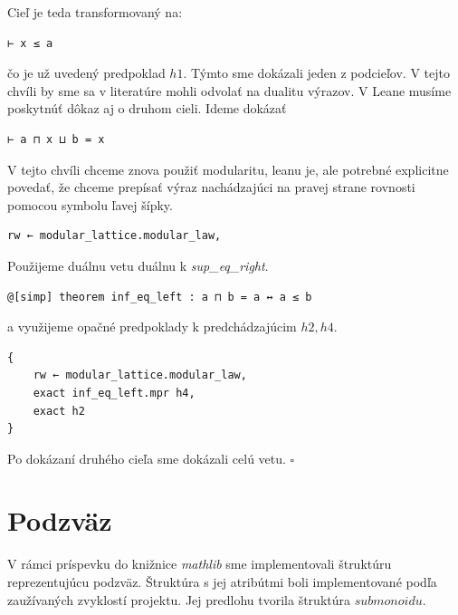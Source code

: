 \documentclass[a4paper,10pt,oneside]{report}%
\begin{document}
    Cieľ je teda transformovaný na:
\begin{lstlisting}
⊢ x ≤ a
\end{lstlisting}
čo je už uvedený predpoklad $h1$. Týmto sme dokázali jeden z podcieľov.
    V tejto chvíli by sme sa v literatúre mohli odvolať na dualitu výrazov.
    V Leane musíme poskytnúť dôkaz aj o druhom cieli. Ideme dokázať
\begin{lstlisting}
⊢ a ⊓ x ⊔ b = x
\end{lstlisting}
V tejto chvíli chceme znova použiť modularitu, leanu je, ale potrebné explicitne povedať,
    že chceme prepísať výraz nachádzajúci na pravej strane rovnosti pomocou symbolu
ľavej šípky.
\begin{lstlisting}
rw ← modular_lattice.modular_law,
\end{lstlisting}
    Použijeme duálnu vetu
    duálnu k \emph{sup\_eq\_right}.
\begin{lstlisting}
@[simp] theorem inf_eq_left : a ⊓ b = a ↔ a ≤ b
\end{lstlisting}
    a využijeme opačné predpoklady k predchádzajúcim $h2, h4$.
\begin{lstlisting}
{
    rw ← modular_lattice.modular_law,
    exact inf_eq_left.mpr h4,
    exact h2
}
\end{lstlisting}

    Po dokázaní druhého cieľa sme dokázali celú vetu. $\square$

\section{Podzväz}
    V rámci príspevku do knižnice \emph{mathlib} sme implementovali štruktúru
reprezentujúcu podzväz. Štruktúra s jej atribútmi boli implementované podľa
zaužívaných zvyklostí projektu. Jej predlohu tvorila štruktúra $submonoidu$.
\end{document}
